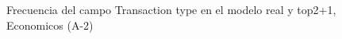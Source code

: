\begin{figure}[H]
    \centering
    
    \caption{Frecuencia del campo Transaction type en el modelo real y top2+1, Economicos (A-2)}
    \label{frecuency-Transaction Type-top2+1}
\end{figure}